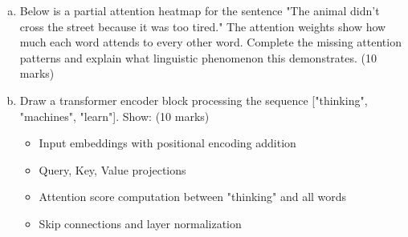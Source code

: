 \documentclass[12pt]{article}
\newcommand{\mediumanswer}{\vspace{3cm}}         %
\begin{document}
\begin{enumerate}[(a)]
    \item Below is a partial attention heatmap for the sentence "The animal didn't cross the street because it was too tired." The attention weights show how much each word attends to every other word. Complete the missing attention patterns and explain what linguistic phenomenon this demonstrates. \hfill (10 marks)
    
    \begin{center}
    \end{center}
    
    \mediumanswer
    
    \item Draw a transformer encoder block processing the sequence ["thinking", "machines", "learn"]. Show: \hfill (10 marks)
    \begin{itemize}
        \item Input embeddings with positional encoding addition
        \item Query, Key, Value projections 
        \item Attention score computation between "thinking" and all words
        \item Skip connections and layer normalization
    \end{itemize}
    

\end{enumerate}
\end{document}
